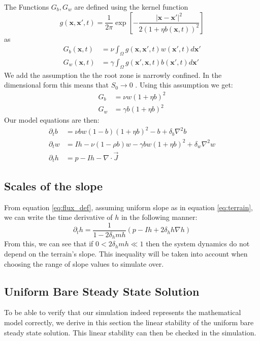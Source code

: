 \documentclass{article}
\numberwithin{equation}{section}
\begin{document}
The Functions $G_b,G_w$ are defined using the kernel function
\begin{equation}
    g(\mathbf{x}, \mathbf{x'},t) = \frac{1}{2\pi} \exp\left[-\frac{\left|\mathbf{x}-\mathbf{x'}\right|^2}{2(1+\eta b(\mathbf{x},t))^2}\right]
\end{equation} as \begin{align}
    G_b(\mathbf{x},t) & = \nu \int_\Omega g(\mathbf{x},\mathbf{x'},t)w(\mathbf{x'},t)d\mathbf{x'}    \\
    G_w(\mathbf{x},t) & = \gamma \int_\Omega g(\mathbf{x'},\mathbf{x},t)b(\mathbf{x'},t)d\mathbf{x'}
\end{align}
We add the assumption the the root zone is narrowly confined. In the dimensional form this means that $S_0\rightarrow 0$ \parencite[see][eq (3)]{gilad_phys_2004}. Using this assumption we get:
\begin{align}
    G_b & = \nu w (1+\eta b)^2   \\
    G_w & = \gamma b(1+\eta b)^2
\end{align}
Our model equations are then:
\begin{align}
    \partial_t b & = \nu bw(1-b)(1+\eta b)^2 - b + \delta_b\nabla^2 b                   \\
    \partial_t w & = I h - \nu(1-\rho b)w - \gamma bw(1+\eta b)^2 + \delta_w \nabla^2 w \\
    \partial_t h & = p - I h - \nabla \cdot \vec{J}
\end{align}

\subsection{Scales of the slope}
From equation \ref{eq:flux_def}, assuming uniform slope as in equation \ref{eq:terrain}, we can write the time derivative of $h$ in the following manner:
\begin{equation}
    \partial_t h = \frac{1}{1 - 2\delta_h m h} \left(p - I h + 2\delta_h h\nabla h\right)
\end{equation}
From this, we can see that if $0 < 2\delta_h m h \ll 1$ then the system dynamics do not depend on the terrain's slope. This inequality will be taken into account when choosing the range of slope values to simulate over.

\subsection{Uniform Bare Steady State Solution}
To be able to verify that our simulation indeed represents the mathematical model correctly, we derive in this section the linear stability of the uniform bare steady state solution. This linear stability can then be checked in the simulation.
\end{document}
